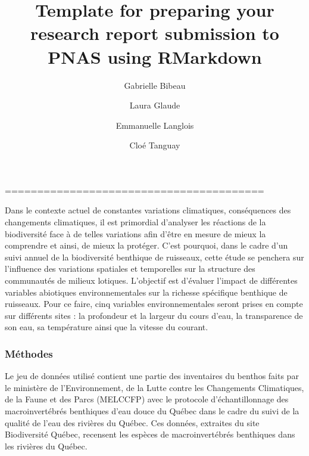 \documentclass[9pt,twocolumn,twoside,]{pnas-new}
\title{Template for preparing your research report submission to PNAS
using RMarkdown}
\author[a,1]{Gabrielle Bibeau}
\author[a]{Laura Glaude}
\author[a]{Emmanuelle Langlois}
\author[a]{Cloé Tanguay}
\affil[a]{Université de Sherbrooke, Département de Biologie, 2500
Boulevard de l'Université, Sherbrooke, Québec, Canada}
\begin{document}
\verticaladjustment{-2pt}



\maketitle
\thispagestyle{firststyle}



========================================

Dans le contexte actuel de constantes variations climatiques,
conséquences des changements climatiques, il est primordial d'analyser
les réactions de la biodiversité face à de telles variations afin d'être
en mesure de mieux la comprendre et ainsi, de mieux la protéger. C'est
pourquoi, dans le cadre d'un suivi annuel de la biodiversité benthique
de ruisseaux, cette étude se penchera sur l'influence des variations
spatiales et temporelles sur la structure des communautés de milieux
lotiques. L'objectif est d'évaluer l'impact de différentes variables
abiotiques environnementales sur la richesse spécifique benthique de
ruisseaux. Pour ce faire, cinq variables environnementales seront prises
en compte sur différents sites : la profondeur et la largeur du cours
d'eau, la transparence de son eau, sa température ainsi que la vitesse
du courant.

\hypertarget{muxe9thodes}{%
\subsubsection*{Méthodes}\label{muxe9thodes}}

Le jeu de données utilisé contient une partie des inventaires du benthos
faits par le ministère de l'Environnement, de la Lutte contre les
Changements Climatiques, de la Faune et des Parcs (MELCCFP) avec le
protocole d'échantillonnage des macroinvertébrés benthiques d'eau douce
du Québec dans le cadre du suivi de la qualité de l'eau des rivières du
Québec. Ces données, extraites du site Biodiversité Québec, recensent
les espèces de macroinvertébrés benthiques dans les rivières du Québec.
\end{document}
